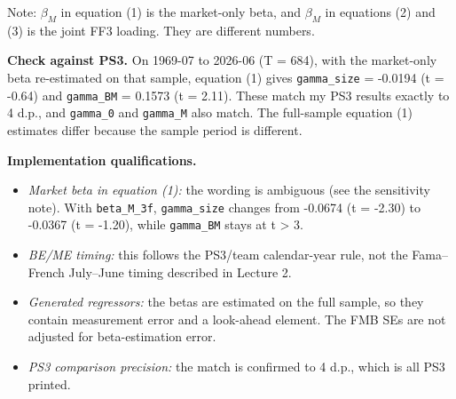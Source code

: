 \documentclass[11pt,letterpaper]{article}
\begin{document}
\begin{center}
\small
{}
\end{center}

Note: \(\beta_M\) in equation (1) is the market-only beta, and \(\beta_M\) in equations (2) and (3) is the joint FF3 loading. They are different numbers.

\textbf{Check against PS3.} On 1969-07 to 2026-06 (T = 684), with the market-only beta re-estimated on that sample, equation (1) gives \texttt{gamma\_size} = -0.0194 (t = -0.64) and \texttt{gamma\_BM} = 0.1573 (t = 2.11). These match my PS3 results exactly to 4 d.p., and \texttt{gamma\_0} and \texttt{gamma\_M} also match. The full-sample equation (1) estimates differ because the sample period is different.

\textbf{Implementation qualifications.}

\begin{itemize}
\item
  \emph{Market beta in equation (1):} the wording is ambiguous (see the sensitivity note). With \texttt{beta\_M\_3f}, \texttt{gamma\_size} changes from -0.0674 (t = -2.30) to -0.0367 (t = -1.20), while \texttt{gamma\_BM} stays at t \textgreater{} 3.
\item
  \emph{BE/ME timing:} this follows the PS3/team calendar-year rule, not the Fama--French July--June timing described in Lecture 2.
\item
  \emph{Generated regressors:} the betas are estimated on the full sample, so they contain measurement error and a look-ahead element. The FMB SEs are not adjusted for beta-estimation error.
\item
  \emph{PS3 comparison precision:} the match is confirmed to 4 d.p., which is all PS3 printed.
\end{itemize}
\end{document}
